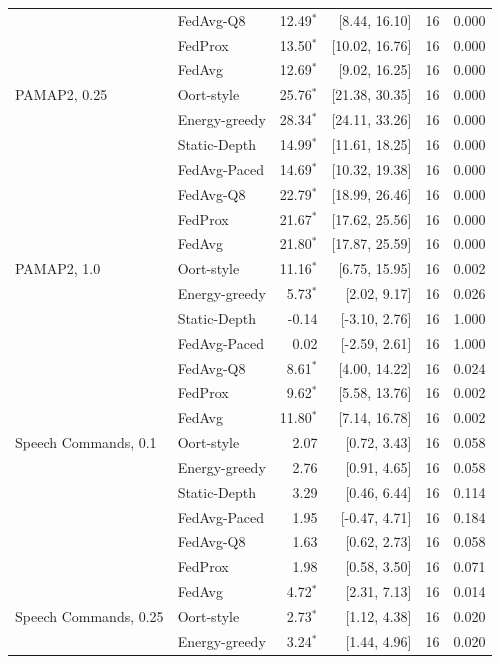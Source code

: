 \begin{tabular}{@{}llrrrr@{}}
 & FedAvg-Q8 & 12.49$^{*}$ & [8.44, 16.10] & 16 & 0.000\\
 & FedProx & 13.50$^{*}$ & [10.02, 16.76] & 16 & 0.000\\
 & FedAvg & 12.69$^{*}$ & [9.02, 16.25] & 16 & 0.000\\
\midrule
PAMAP2, 0.25 & Oort-style & 25.76$^{*}$ & [21.38, 30.35] & 16 & 0.000\\
 & Energy-greedy & 28.34$^{*}$ & [24.11, 33.26] & 16 & 0.000\\
 & Static-Depth & 14.99$^{*}$ & [11.61, 18.25] & 16 & 0.000\\
 & FedAvg-Paced & 14.69$^{*}$ & [10.32, 19.38] & 16 & 0.000\\
 & FedAvg-Q8 & 22.79$^{*}$ & [18.99, 26.46] & 16 & 0.000\\
 & FedProx & 21.67$^{*}$ & [17.62, 25.56] & 16 & 0.000\\
 & FedAvg & 21.80$^{*}$ & [17.87, 25.59] & 16 & 0.000\\
\midrule
PAMAP2, 1.0 & Oort-style & 11.16$^{*}$ & [6.75, 15.95] & 16 & 0.002\\
 & Energy-greedy & 5.73$^{*}$ & [2.02, 9.17] & 16 & 0.026\\
 & Static-Depth & -0.14 & [-3.10, 2.76] & 16 & 1.000\\
 & FedAvg-Paced & 0.02 & [-2.59, 2.61] & 16 & 1.000\\
 & FedAvg-Q8 & 8.61$^{*}$ & [4.00, 14.22] & 16 & 0.024\\
 & FedProx & 9.62$^{*}$ & [5.58, 13.76] & 16 & 0.002\\
 & FedAvg & 11.80$^{*}$ & [7.14, 16.78] & 16 & 0.002\\
\midrule
Speech Commands, 0.1 & Oort-style & 2.07 & [0.72, 3.43] & 16 & 0.058\\
 & Energy-greedy & 2.76 & [0.91, 4.65] & 16 & 0.058\\
 & Static-Depth & 3.29 & [0.46, 6.44] & 16 & 0.114\\
 & FedAvg-Paced & 1.95 & [-0.47, 4.71] & 16 & 0.184\\
 & FedAvg-Q8 & 1.63 & [0.62, 2.73] & 16 & 0.058\\
 & FedProx & 1.98 & [0.58, 3.50] & 16 & 0.071\\
 & FedAvg & 4.72$^{*}$ & [2.31, 7.13] & 16 & 0.014\\
\midrule
Speech Commands, 0.25 & Oort-style & 2.73$^{*}$ & [1.12, 4.38] & 16 & 0.020\\
 & Energy-greedy & 3.24$^{*}$ & [1.44, 4.96] & 16 & 0.020\\

\end{tabular}
